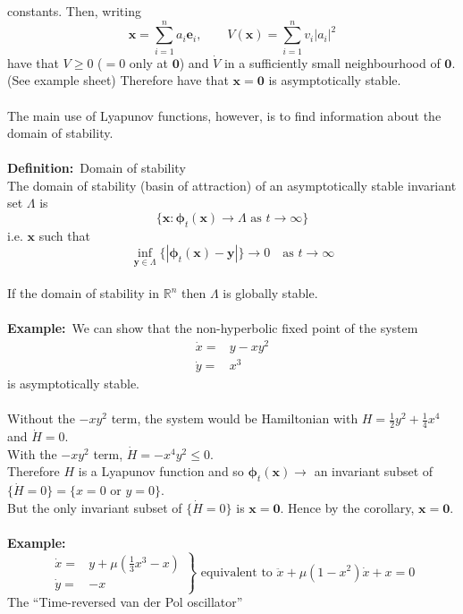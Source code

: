 \documentclass{article}
\newcommand{\example}{\textbf{Example:}}                    %
\newcommand{\definition}{\textbf{Definition:}}              %
\newcommand{\bp}{\bm{\phi}}                                 %
\newcommand{\bx}{\bm{x}}                                    %
\begin{document}
constants. Then, writing 
\[ \bx = \sum_{i=1}^{n} a_i \bm{e}_i, \qquad V(\bx) = \sum_{i=1}^{n} v_i |a_i|^2\]
have that $V \geq 0$ ($=0$ only at
$\bm{0}$) and $\dot{V}$ in a sufficiently small neighbourhood of $\bm{0}$.
(See example sheet) Therefore have that $\bx = \bm{0}$ is asymptotically
stable.
\\
\\
The main use of Lyapunov functions, however, is to find information about the
domain of stability.
\\
\\
\definition\ Domain of stability
\\
The domain of stability (basin of attraction) of an asymptotically stable
invariant set $\Lambda$ is 
\[ \{ \bx : \bp_t(\bx) \to \Lambda \mbox{ as } t \to \infty \} \]
i.e. $\bx$ such that 
\[ \inf_{\bm{y} \in \Lambda} \{| \bp_t(\bx) - \bm{y} | \} \to 0 \quad \mbox{as } t \to \infty\]
\\
If the domain of stability in $\mathbb{R}^n$ then $\Lambda$ is globally stable.
\\
\\
\example\ We can show that the non-hyperbolic fixed point of the system
\begin{align*}
 \dot{x} =& y-xy^2 \\
 \dot{y} =& x^3
\end{align*}
is asymptotically stable.
\\
\\
Without the $-xy^2$ term, the system would be Hamiltonian with 
$H = \frac{1}{2}y^2+\frac{1}{4}x^4$ and $\dot{H}=0$.
\\
With the $-xy^2$ term, $\dot{H} = -x^4 y^2 \leq 0$.
\\
Therefore $H$ is a Lyapunov function and so $\bp_t(\bx) \to$ an invariant
subset of $\{\dot{H}=0\} = \{ x = 0 \mbox{ or } y = 0 \}$.
\\
But the only invariant subset of $\{ \dot{H} = 0 \}$ is $\bx = \bm{0}$.
Hence by the corollary, $\bx = \bm{0}$.
\\
\\
\example\
\[ \left. \begin{array}{cl} \dot{x} = & y + \mu ( \frac{1}{3} x^3 - x) \\
			    \dot{y} = & -x \end{array}
\right\} \mbox{ equivalent to } \ddot{x} + \mu (1 - x^2) \dot{x} + x = 0 \]
The ``Time-reversed van der Pol oscillator''
\end{document}
